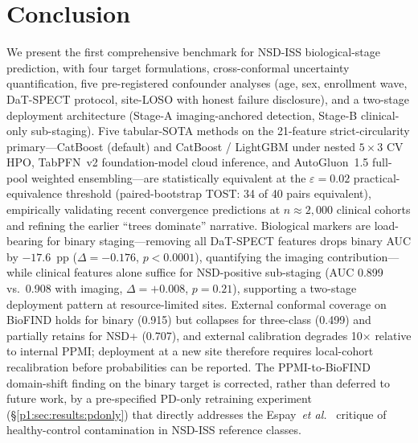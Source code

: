 \section{Conclusion}
\label{p1:sec:conclusion}

We present the first comprehensive benchmark for NSD-ISS biological-stage prediction, with four target formulations, cross-conformal uncertainty quantification, five pre-registered confounder analyses (age, sex, enrollment wave, DaT-SPECT protocol, site-LOSO with honest failure disclosure), and a two-stage deployment architecture (Stage-A imaging-anchored detection, Stage-B clinical-only sub-staging). Five tabular-SOTA methods on the 21-feature strict-circularity primary---CatBoost (default) and CatBoost / LightGBM under nested $5{\times}3$ CV HPO, TabPFN~v2 foundation-model cloud inference, and AutoGluon~1.5 full-pool weighted ensembling---are statistically equivalent at the $\varepsilon{=}0.02$ practical-equivalence threshold (paired-bootstrap TOST: 34 of 40 pairs equivalent), empirically validating recent convergence predictions at $n \approx 2{,}000$ clinical cohorts and refining the earlier ``trees dominate'' narrative. Biological markers are load-bearing for binary staging---removing all DaT-SPECT features drops binary AUC by $-17.6$~pp ($\Delta{=}-0.176$, $p{<}0.0001$), quantifying the imaging contribution---while clinical features alone suffice for NSD-positive sub-staging (AUC 0.899 vs.\ 0.908 with imaging, $\Delta{=}+0.008$, $p{=}0.21$), supporting a two-stage deployment pattern at resource-limited sites. External conformal coverage on BioFIND holds for binary (0.915) but collapses for three-class (0.499) and partially retains for NSD+ (0.707), and external calibration degrades 10$\times$ relative to internal PPMI; deployment at a new site therefore requires local-cohort recalibration before probabilities can be reported. The PPMI-to-BioFIND domain-shift finding on the binary target is corrected, rather than deferred to future work, by a pre-specified PD-only retraining experiment (\S\ref{p1:sec:results:pdonly}) that directly addresses the Espay~\textit{et al.}~\cite{espay2025med} critique of healthy-control contamination in NSD-ISS reference classes.

